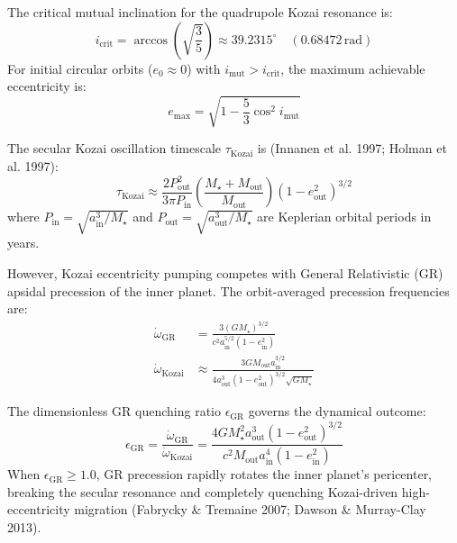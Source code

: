 \documentclass[11pt,a4paper]{article}
\begin{document}
The critical mutual inclination for the quadrupole Kozai resonance is:
\begin{equation}
i_{\text{crit}} = \arccos\left(\sqrt{\frac{3}{5}}\right) \approx 39.2315^\circ \quad (0.68472\,\text{rad})
\label{eq:i_crit}
\end{equation}
For initial circular orbits ($e_0 \approx 0$) with $i_{\text{mut}} > i_{\text{crit}}$, the maximum achievable eccentricity is:
\begin{equation}
e_{\text{max}} = \sqrt{1 - \frac{5}{3} \cos^2 i_{\text{mut}}}
\label{eq:e_max}
\end{equation}

The secular Kozai oscillation timescale $\tau_{\text{Kozai}}$ is (Innanen et al. 1997; Holman et al. 1997):
\begin{equation}
\tau_{\text{Kozai}} \approx \frac{2 P_{\text{out}}^2}{3\pi P_{\text{in}}} \left(\frac{M_\star + M_{\text{out}}}{M_{\text{out}}}\right) \left(1 - e_{\text{out}}^2\right)^{3/2}
\label{eq:tau_kozai}
\end{equation}
where $P_{\text{in}} = \sqrt{a_{\text{in}}^3 / M_\star}$ and $P_{\text{out}} = \sqrt{a_{\text{out}}^3 / M_\star}$ are Keplerian orbital periods in years.

However, Kozai eccentricity pumping competes with General Relativistic (GR) apsidal precession of the inner planet. The orbit-averaged precession frequencies are:
\begin{align}
\dot{\omega}_{\text{GR}} &= \frac{3 (G M_\star)^{3/2}}{c^2 a_{\text{in}}^{5/2} (1 - e_{\text{in}}^2)} \label{eq:omega_gr} \\
\dot{\omega}_{\text{Kozai}} &\approx \frac{3 G M_{\text{out}} a_{\text{in}}^{3/2}}{4 a_{\text{out}}^3 (1 - e_{\text{out}}^2)^{3/2} \sqrt{G M_\star}} \label{eq:omega_kozai}
\end{align}

The dimensionless GR quenching ratio $\epsilon_{\text{GR}}$ governs the dynamical outcome:
\begin{equation}
\epsilon_{\text{GR}} = \frac{\dot{\omega}_{\text{GR}}}{\dot{\omega}_{\text{Kozai}}} = \frac{4 G M_\star^2 a_{\text{out}}^3 (1 - e_{\text{out}}^2)^{3/2}}{c^2 M_{\text{out}} a_{\text{in}}^4 (1 - e_{\text{in}}^2)}
\label{eq:epsilon_gr}
\end{equation}
When $\epsilon_{\text{GR}} \ge 1.0$, GR precession rapidly rotates the inner planet's pericenter, breaking the secular resonance and completely quenching Kozai-driven high-eccentricity migration (Fabrycky \& Tremaine 2007; Dawson \& Murray-Clay 2013).
\end{document}
